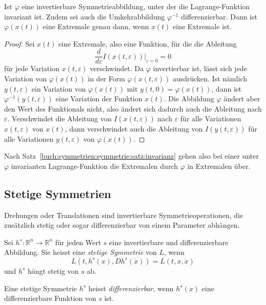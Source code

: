 \begin{satz}
\label{buch:symmetrien:symmetrie:satz:invarianz}
Ist $\varphi$ eine invertierbare Symmetrieabbildung, unter der die
Lagrange-Funktion invariant ist.
Zudem sei auch die Umkehrabbildung $\varphi^{-1}$ differenzierbar.
Dann ist $\varphi(x(t))$ eine Extremale genau dann, wenn $x(t)$ eine
Extremale ist.
\end{satz}

\begin{proof}
Sei $x(t)$ eine Extremale, also eine Funktion, für die die Ableitung
\[
\frac{d}{d\varepsilon}I(x(t,\varepsilon))
\bigg|_{\varepsilon=0}
=
0
\]
für jede Variation $x(t,\varepsilon)$ verschwindet.
Da $\varphi$ invertierbar ist, lässt sich jede Variation von
$\varphi(x(t))$ in der Form $\varphi(x(t,\varepsilon))$ ausdrücken.
Ist nämlich $y(t,\varepsilon)$ ein Variation von $\varphi(x(t))$
mit $y(t,0) = \varphi(x(t))$, dann ist $\varphi^{-1}(y(t,\varepsilon))$
eine Variation der Funktion $x(t)$.
Die Abbildung $\varphi$ ändert aber den Wert des Funktionals nicht,
also ändert sich dadurch auch die Ableitung nach $\varepsilon$.
Verschwindet die Ableitung von $I(x(t,\varepsilon))$ nach $\varepsilon$
für alle Variationen $x(t,\varepsilon)$ von $x(t)$, dann verschwindet
auch die Ableitung von $I(y(t,\varepsilon))$ für alle Variationen
$y(t,\varepsilon)$ von $\varphi(x(t))$.
\end{proof}

Nach Satz~\ref{buch:symmetrien:symmetrie:satz:invarianz} gehen 
also bei einer unter $\varphi$ invarianten Lagrange-Funktion die
Extremalen durch $\varphi$ in Extremalen über.

%
%
\subsection{Stetige Symmetrien}
Drehungen oder Translationen sind invertierbare Symmetrieoperationen,
die zusätzlich stetig oder sogar differenzierbar von einem Parameter
abhängen.

\begin{definition}
Sei $h^s\colon \mathbb{R}^n\to\mathbb{R}^n$ für jeden Wert $s$
eine invertierbare und differenzierbare Abbildung.
Sie heisst eine {\em stetige Symmetrie} von $L$, wenn
\[
L(t, h^s(x), Dh^s(\dot{x}))
=
L(t,x,\dot{x})
\]
und $h^s$ hängt stetig von $s$ ab.
\end{definition}

\begin{definition}
Eine stetige Symmetrie 
$h^s$ heisst {\em differenzierbar}, wenn $h^s(x)$
eine differenzierbare Funktion von $s$ ist.
\end{definition}

